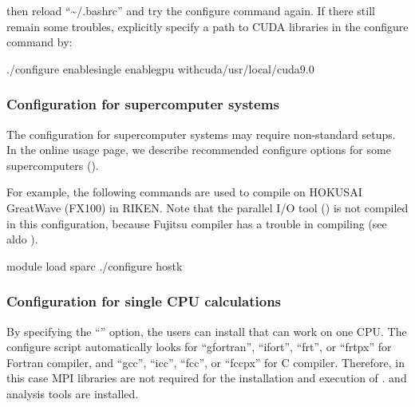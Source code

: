 \documentclass[a4paper,11pt,oneside,english]{sphinxmanual}
\begin{document}
then reload “\textasciitilde{}/.bashrc” and try the configure command again.
If there still remain some troubles, explicitly specify a path to CUDA
libraries in the configure command by:

\begin{sphinxVerbatim}[commandchars=\\\{\}]
\PYGZdl{} ./configure \PYGZhy{}\PYGZhy{}enable\PYGZhy{}single \PYGZhy{}\PYGZhy{}enable\PYGZhy{}gpu \PYGZhy{}\PYGZhy{}with\PYGZhy{}cuda/usr/local/cuda\PYGZhy{}9.0
\end{sphinxVerbatim}


\subsubsection{Configuration for supercomputer systems}
\label{\detokenize{01_Getting_Started:configuration-for-supercomputer-systems}}
The configuration for supercomputer systems may require non-standard setups.
In the online usage page, we describe recommended configure options for some supercomputers
().

For example, the following commands are used to compile  on HOKUSAI GreatWave
(FX100) in RIKEN.
Note that the parallel I/O tool () is not compiled in this configuration,
because Fujitsu compiler has a trouble in compiling  (see aldo {\hyperref[\detokenize{02_Available_Programs:available-programs}]{}}).

\begin{sphinxVerbatim}[commandchars=\\\{\}]
\PYGZdl{} module load sparc
\PYGZdl{} ./configure \PYGZhy{}\PYGZhy{}hostk
\end{sphinxVerbatim}


\subsubsection{Configuration for single CPU calculations}
\label{\detokenize{01_Getting_Started:configuration-for-single-cpu-calculations}}
By specifying the “” option, the users can install  that can work on one CPU.
The configure script automatically looks for “gfortran”, “ifort”, “frt”, or “frtpx” for Fortran compiler,
and “gcc”, “icc”, “fcc”, or “fccpx” for C compiler. Therefore, in this case MPI libraries are not required
for the installation and execution of .  and analysis tools are installed.
\end{document}
